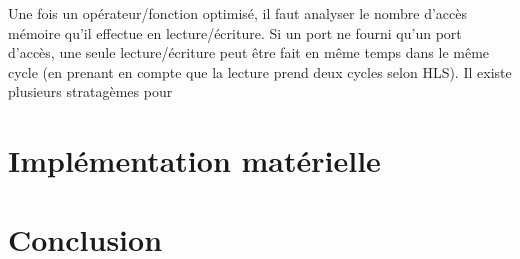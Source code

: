 \documentclass[12pt,a4paper]{article}
\begin{document}
Une fois un opérateur/fonction optimisé, il faut analyser le nombre d'accès mémoire qu'il effectue en lecture/écriture. Si un port ne fourni qu'un port d'accès, une seule lecture/écriture peut être fait en même temps dans le même cycle (en prenant en compte que la lecture prend deux cycles selon HLS). Il existe plusieurs stratagèmes pour


\section{Implémentation matérielle}

\section{Conclusion}
\end{document}

